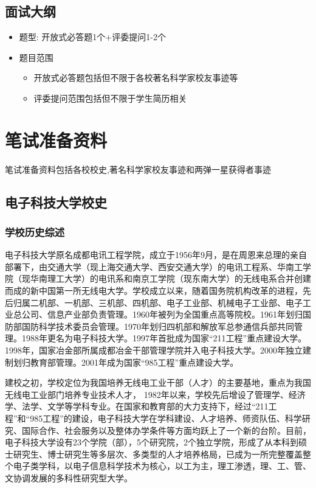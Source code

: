 \documentclass[UTF8]{ctexart}
\begin{document}
    \subsection{面试大纲}
    \begin{itemize}
        \item 题型: 开放式必答题1个+评委提问1-2个
        \item 题目范围
        \begin{itemize}
            \item 开放式必答题包括但不限于各校著名科学家校友事迹等
            \item 评委提问范围包括但不限于学生简历相关
        \end{itemize}
    \end{itemize}
    
    \section{笔试准备资料}
    笔试准备资料包括各校校史,著名科学家校友事迹和两弹一星获得者事迹
    \subsection{电子科技大学校史}
    \subsubsection{学校历史综述}
    电子科技大学原名成都电讯工程学院，成立于1956年9月，是在周恩来总理的亲自部署下，由交通大学（现上海交通大学、西安交通大学）的电讯工程系、华南工学院（现华南理工大学）的电讯系和南京工学院（现东南大学）的无线电系合并创建而成的新中国第一所无线电大学。学校成立以来，随着国务院机构改革的进程，先后归属二机部、一机部、三机部、四机部、电子工业部、机械电子工业部、电子工业总公司、信息产业部负责管理。1960年被列为全国重点高等院校。1961年划归国防部国防科学技术委员会管理。1970年划归四机部和解放军总参通信兵部共同管理。1988年更名为电子科技大学。1997年首批成为国家“211工程”重点建设大学。1998年，国家冶金部所属成都冶金干部管理学院并入电子科技大学。2000年独立建制划归教育部管理。2001年成为国家“985工程”重点建设大学。

    建校之初，学校定位为我国培养无线电工业干部（人才）的主要基地，重点为我国无线电工业部门培养专业技术人才， 1982年以来，学校先后增设了管理学、经济学、法学、文学等学科专业。在国家和教育部的大力支持下，经过“211工程”和“985工程”的建设，电子科技大学在学科建设、人才培养、师资队伍、科学研究、国际合作、社会服务以及整体办学条件等方面均跃上了一个新的台阶。目前，电子科技大学设有23个学院（部），5个研究院，2个独立学院，形成了从本科到硕士研究生、博士研究生等多层次、多类型的人才培养格局，已成为一所完整覆盖整个电子类学科，以电子信息科学技术为核心，以工为主，理工渗透，理、工、管、文协调发展的多科性研究型大学。
\end{document}
